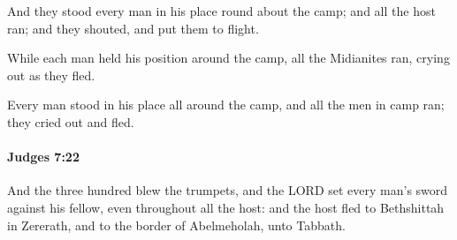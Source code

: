 			\begin{versebox}
					\item[BHS] 
					\item[ASV] And they stood every man in his place round about the camp; and all the host ran; and they shouted, and put them to flight.
					\item[NIV] While each man held his position around the camp, all the Midianites ran, crying out as they fled.
					\item[NRSV] Every man stood in his place all around the camp, and all the men in camp ran; they cried out and fled.
			\end{versebox}

		\paragraph{Judges 7:22} %
			\label{JUDGES-7-22}

			And the three hundred blew the trumpets, and the LORD set every man’s sword against his fellow, even throughout all the host: and the host fled to Bethshittah in Zererath, and to the border of Abelmeholah, unto Tabbath.

